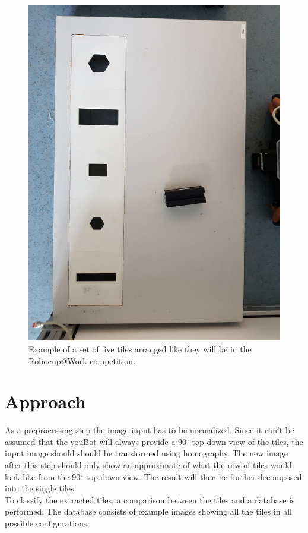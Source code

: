 \documentclass{article}
\begin{document}
\begin{figure}[h!]
\centering
\includegraphics[scale=0.15,angle=270]{images/5tiles.jpeg}
\caption{Example of a set of five tiles arranged like they will be in the Robocup@Work competition.}
\label{fig:row}
\end{figure}




\section{Approach}


As a preprocessing step the image input has to be normalized. Since it can't be assumed that the youBot will always provide a 90$^\circ$ top-down view of the tiles, the input image should should be transformed using homography. The new image after this step should only show an approximate of what the row of tiles would look like from the 90$^\circ$ top-down view. The result will then be further decomposed into the single tiles.\\
To classify the extracted tiles, a comparison between the tiles and a database is performed. The database consists of example images showing all the tiles in all possible configurations.\\
\end{document}
